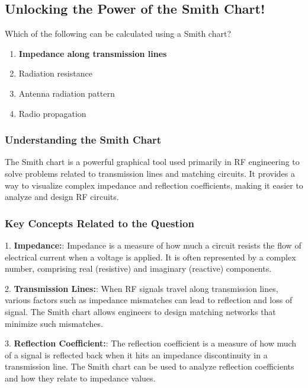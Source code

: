 \subsection{Unlocking the Power of the Smith Chart!}

\begin{tcolorbox}[colback=gray!10, colframe=black, title=E9G01] Which of the following can be calculated using a Smith chart?
\begin{enumerate}[label=\Alph*.]
    \item \textbf{Impedance along transmission lines}
    \item Radiation resistance
    \item Antenna radiation pattern
    \item Radio propagation
\end{enumerate} \end{tcolorbox}



\subsubsection{Understanding the Smith Chart}

The Smith chart is a powerful graphical tool used primarily in RF engineering to solve problems related to transmission lines and matching circuits. It provides a way to visualize complex impedance and reflection coefficients, making it easier to analyze and design RF circuits.

\subsubsection{Key Concepts Related to the Question}

1. \textbf{Impedance:}: Impedance is a measure of how much a circuit resists the flow of electrical current when a voltage is applied. It is often represented by a complex number, comprising real (resistive) and imaginary (reactive) components.

2. \textbf{Transmission Lines:}: When RF signals travel along transmission lines, various factors such as impedance mismatches can lead to reflection and loss of signal. The Smith chart allows engineers to design matching networks that minimize such mismatches.

3. \textbf{Reflection Coefficient:}: The reflection coefficient is a measure of how much of a signal is reflected back when it hits an impedance discontinuity in a transmission line. The Smith chart can be used to analyze reflection coefficients and how they relate to impedance values.

